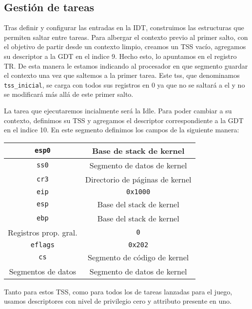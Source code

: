 \subsection{Gestión de tareas}

Tras definir y configurar las entradas en la IDT, construimos las estructuras que permiten saltar entre tareas.
Para albergar el contexto previo al primer salto, con el objetivo de partir desde un contexto limpio, creamos un TSS vacío, agregamos su descriptor a la GDT en el indice 9.
Hecho esto, lo apuntamos en el registro TR. De esta manera le estamos indicando al procesador en que segmento guardar el contexto una vez que saltemos a la primer tarea. 
Este tss, que denominamos \verb|tss_inicial|, se carga con todos sus registros en 0 ya que no se saltará a el y no se modificará más allá de este primer salto.

La tarea que ejecutaremos incialmente será la Idle. Para poder cambiar a su contexto, definimos su TSS y agregamos el descriptor correspondiente a la GDT en el indice 10.
En este segmento definimos los campos de la siguiente manera:\\


\begin{center}
\begin{tabular}{ |c| c | }
\hline
\verb|esp0| & Base de stack de kernel\\
\hline
\verb|ss0|  & Segmento de datos de kernel\\
\hline
\verb|cr3|  & Directorio de páginas de kernel\\
\hline
\verb|eip|  & \verb|0x1000|\\
\hline
\verb|esp|  & Base del stack de kernel\\
\hline
\verb|ebp|  & Base del stack de kernel\\
\hline
Registros prop. gral. & \verb|0|\\
\hline
\verb|eflags| & \verb|0x202|\\
\hline
\verb|cs| & Segmento de código de kernel\\
\hline
Segmentos de datos & Segmento de datos de kernel\\
\hline
\end{tabular}
\end{center}
\vspace{10pt}


Tanto para estos TSS, como para todos los de tareas lanzadas para el juego, usamos descriptores con nivel de privilegio cero y attributo presente en uno.\\\textbf{}

